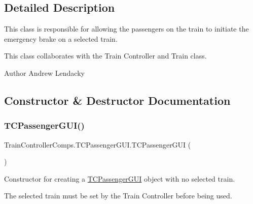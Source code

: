 \subsection{Detailed Description}
This class is responsible for allowing the passengers on the train to initiate the emergency brake on a selected train. 

This class collaborates with the Train Controller and Train class.

\begin{DoxyAuthor}{Author}
Andrew Lendacky 
\end{DoxyAuthor}


\subsection{Constructor \& Destructor Documentation}
\mbox{\label{classTrainControllerComps_1_1TCPassengerGUI_a87ff0e93bee02d188abdd03e33517244}} 
\subsubsection{\texorpdfstring{T\+C\+Passenger\+G\+U\+I()}{TCPassengerGUI()}\hspace{0.1cm}{\footnotesize\ttfamily [1/2]}}
{\footnotesize\ttfamily Train\+Controller\+Comps.\+T\+C\+Passenger\+G\+U\+I.\+T\+C\+Passenger\+G\+UI (\begin{DoxyParamCaption}{ }\end{DoxyParamCaption})}



Constructor for creating a \hyperlink{classTrainControllerComps_1_1TCPassengerGUI}{T\+C\+Passenger\+G\+UI} object with no selected train. 

The selected train must be set by the Train Controller before being used. \mbox{\label{classTrainControllerComps_1_1TCPassengerGUI_a1a4a77c620d2c30d15de7d18068893f1}} 
